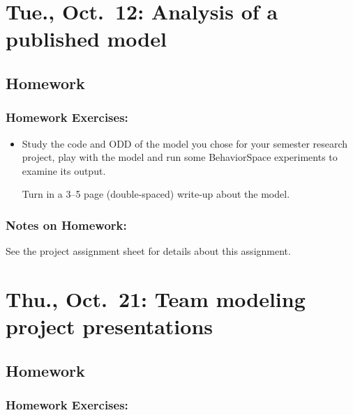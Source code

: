 \documentclass[
]{article}
\begin{document}
\hypertarget{tue.-oct.-12-analysis-of-a-published-model}{%
\section{Tue., Oct.~12: Analysis of a published
model}\label{tue.-oct.-12-analysis-of-a-published-model}}

\hypertarget{homework-10}{%
\subsection{Homework}\label{homework-10}}

\hypertarget{homework-exercises-10}{%
\subsubsection{Homework Exercises:}\label{homework-exercises-10}}

\begin{itemize}
\item
  Study the code and ODD of the model you chose for your semester
  research project, play with the model and run some BehaviorSpace
  experiments to examine its output.

  Turn in a 3--5 page (double-spaced) write-up about the model.
\end{itemize}

\hypertarget{notes-on-homework-6}{%
\subsubsection{Notes on Homework:}\label{notes-on-homework-6}}

See the project assignment sheet for details about this assignment.

\hypertarget{thu.-oct.-21-team-modeling-project-presentations}{%
\section{Thu., Oct.~21: Team modeling project
presentations}\label{thu.-oct.-21-team-modeling-project-presentations}}

\hypertarget{homework-11}{%
\subsection{Homework}\label{homework-11}}

\hypertarget{homework-exercises-11}{%
\subsubsection{Homework Exercises:}\label{homework-exercises-11}}
\end{document}
